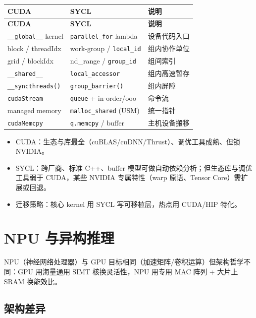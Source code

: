 \documentclass[12pt,a4paper,fontset=fandol]{ctexbook}
\newcommand{\Fn}[1]{\texttt{#1()}}
\begin{document}
\begin{longtable}{p{4.4cm}p{4.4cm}p{5.6cm}}
\toprule
\textbf{CUDA} & \textbf{SYCL} & \textbf{说明} \\
\midrule
\endfirsthead
\toprule
\textbf{CUDA} & \textbf{SYCL} & \textbf{说明} \\
\midrule
\endhead
\texttt{\_\_global\_\_} kernel & \texttt{parallel\_for} lambda & 设备代码入口 \\
block / threadIdx & work-group / \texttt{local\_id} & 组内协作单位 \\
grid / blockIdx & nd\_range / \texttt{group\_id} & 组间索引 \\
\texttt{\_\_shared\_\_} & \texttt{local\_accessor} & 组内高速暂存 \\
\Fn{\_\_syncthreads} & \Fn{group\_barrier} & 组内屏障 \\
\texttt{cudaStream} & \texttt{queue} + in-order/ooo & 命令流 \\
managed memory & \texttt{malloc\_shared} (USM) & 统一指针 \\
\texttt{cudaMemcpy} & \texttt{q.memcpy} / buffer & 主机设备搬移 \\
\bottomrule
\end{longtable}

\begin{tcolorbox}[compare={CUDA vs SYCL 取舍}]
\begin{itemize}[nosep]
  \item CUDA：生态与库最全（cuBLAS/cuDNN/Thrust）、调优工具成熟、但锁 NVIDIA。
  \item SYCL：跨厂商、标准 C++、buffer 模型可做自动依赖分析；但生态库与调优工具弱于 CUDA，某些 NVIDIA 专属特性（warp 原语、Tensor Core）需扩展或回退。
  \item 迁移策略：核心 kernel 用 SYCL 写可移植层，热点用 CUDA/HIP 特化。
\end{itemize}
\end{tcolorbox}

\chapter{NPU 与异构推理}\label{ch:npu}

NPU（神经网络处理器）与 GPU 目标相同（加速矩阵/卷积运算）但架构哲学不同：GPU 用海量通用 SIMT 核换灵活性，NPU 用专用 MAC 阵列 + 大片上 SRAM 换能效比。

\section{架构差异}\label{sec:npu-arch}
\end{document}
